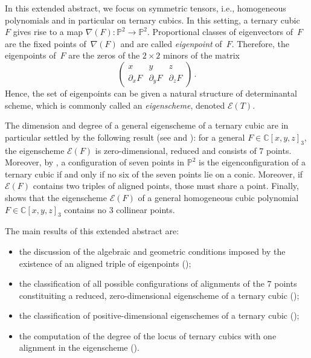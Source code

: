 \documentclass[11pt, a4paper, reqno, captions=tableheading,bibliography=totoc]{scrartcl}
\theoremstyle{plain}
\theoremstyle{definition}
\newcommand{\C}{\mathbb{C}}
\newcommand{\p}{\mathbb{P}}
\newcommand{\Eig}[1]{\mathcal{E}\!\left( {#1} \right)}
\begin{document}
In this extended abstract, we focus on symmetric tensors, i.e., homogeneous polynomials and in particular on ternary cubics.
In this setting, a ternary cubic~$F$ gives rise to a map $\nabla(F) \colon \p^2 \rightarrow \p^2$.
Proportional classes of eigenvectors of~$F$ are the fixed points of~$\nabla(F)$ and are called \emph{eigenpoint} of~$F$.
Therefore, the eigenpoints of~$F$ are the zeros of the $2 \times 2$ minors of the matrix
%
\begin{equation}
\label{eq:def_matrix_general}
    \begin{pmatrix}
    x & y & z \\
    \partial_x F & \partial_y F & \partial_z F
    \end{pmatrix} \,.
\end{equation}
%
Hence, the set of eigenpoints can be given a natural structure of determinantal scheme, which is commonly called an \emph{eigenscheme}, denoted $\Eig{T}$.

The dimension and degree of a general eigenscheme of a ternary cubic are in particular settled by the following result (see \cite[Theorem 2.1]{CartSturm} and \cite{Abo}): for a general $F \in \C[x, y, z]_3$, the eigenscheme $\Eig{F}$ is zero-dimensional, reduced and consists of $7$ points. Moreover, by \cite[Theorem 5.1]{ASS}, a configuration of seven points in $\p^2$ is the eigenconfiguration
of a ternary cubic if and only if no six of the seven points lie on a conic. Moreover, if $\Eig{F}$ contains two triples of aligned points, those must share a point. Finally, \cite[Theorem 5.7]{BGV} shows that the eigenscheme $\Eig{F}$ of a general homogeneous cubic polynomial $F \in \C[x, y, z]_3$ contains no $3$ collinear points.

The main results of this extended abstract are:
%
\begin{itemize}
\item the discussion of the algebraic and geometric conditions imposed by the existence of an aligned triple of eigenpoints ();
\item the classification of all possible configurations of alignments of the $7$ points constituiting a reduced, zero-dimensional eigenscheme of a ternary cubic ();
\item the classification of positive-dimensional eigenschemes of a ternary cubic ();
\item the computation of the degree of the locus of ternary cubics with one alignment in the eigenscheme    ().
\end{itemize}
\end{document}
